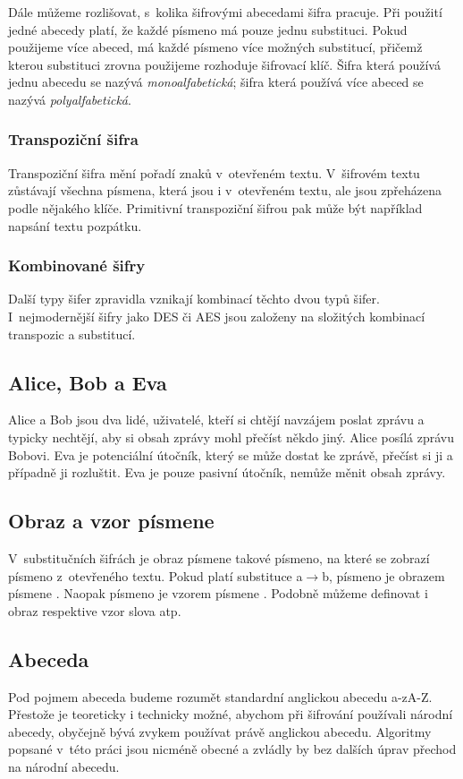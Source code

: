 \documentclass[12pt]{article}
\theoremstyle{definition}
\begin{document}
Dále můžeme rozlišovat, s~kolika šifrovými abecedami šifra pracuje. Při použití jedné abecedy platí, že každé písmeno má pouze jednu substituci. Pokud použijeme více abeced, má každé písmeno více možných substitucí, přičemž kterou substituci zrovna použijeme rozhoduje šifrovací klíč. Šifra která používá jednu abecedu se nazývá {\em monoalfabetická}; šifra která používá více abeced se nazývá {\em polyalfabetická}. 

\subsubsection{Transpoziční šifra}
Transpoziční šifra mění pořadí znaků v~otevřeném textu. V~šifrovém textu zůstávají všechna písmena, která jsou i v~otevřeném textu, ale jsou zpřeházena podle nějakého klíče. Primitivní transpoziční šifrou pak může být například napsání textu pozpátku. 

\subsubsection{Kombinované šifry}

Další typy šifer zpravidla vznikají kombinací těchto dvou typů šifer. I~nejmodernější šifry jako DES či AES jsou založeny na složitých kombinací transpozic a substitucí.

\subsection{Alice, Bob a Eva}
Alice a Bob jsou dva lidé, uživatelé, kteří si chtějí navzájem poslat zprávu a typicky nechtějí, aby si obsah zprávy mohl přečíst někdo jiný. Alice posílá zprávu Bobovi. Eva je potenciální útočník, který se může dostat ke zprávě, přečíst si ji a případně ji rozluštit. Eva je pouze pasivní útočník, nemůže měnit obsah zprávy. 

\subsection{Obraz a vzor písmene}
V~substitučních šifrách je obraz písmene takové písmeno, na které se zobrazí písmeno z~otevřeného textu. Pokud platí substituce a$\rightarrow$b, písmeno  je obrazem písmene . Naopak písmeno  je vzorem písmene . Podobně můžeme definovat i obraz respektive vzor slova atp. 

\subsection{Abeceda}
Pod pojmem abeceda budeme rozumět standardní anglickou abecedu a-zA-Z. Přestože je teoreticky i technicky možné, abychom při šifrování používali národní abecedy, obyčejně bývá zvykem používat právě anglickou abecedu. Algoritmy popsané v~této práci jsou nicméně obecné a zvládly by bez dalších úprav přechod na národní abecedu. 
\end{document}
